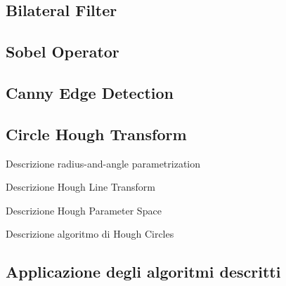 \subsection {Bilateral Filter}



\subsection {Sobel Operator}

\subsection {Canny Edge Detection}


\subsection {Circle Hough Transform}
Descrizione radius-and-angle parametrization

Descrizione Hough Line Transform

Descrizione Hough Parameter Space

Descrizione algoritmo di Hough Circles





\subsection {Applicazione degli algoritmi descritti}

%






